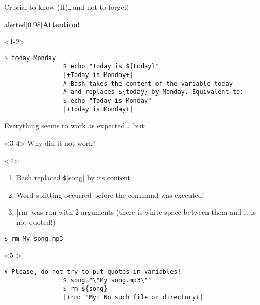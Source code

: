 \begin{frame}[fragile]{Crucial to know (II)}{\ldots{}and not to forget!}
    \begin{overlayarea}{\textwidth}{0.5\textheight}
        \vspace{-9mm}
        \begin{varblock}{alerted}[0.98\textwidth]{\textbf{Attention!}}
        \end{varblock}
        \begin{onlyenv}<1-2>
            \begin{lstlisting}[style=MyBash, belowskip=-4mm]
                $ today=Monday
                $ echo "Today is ${today}"
                |+Today is Monday+|
                # Bash takes the content of the variable today
                # and replaces ${today} by Monday. Equivalent to:
                $ echo "Today is Monday"
                |+Today is Monday+|
            \end{lstlisting}
            \centerline{Everything seems to work as expected\ldots\ but:}
        \end{onlyenv}
        \begin{onlyenv}<3-4>
            Why did it not work?
        \end{onlyenv}
        \begin{onlyenv}<4>
            \begin{enumerate}
                \item Bash replaced \texttt{\$}\bash|{song}| by its content
                \item Word splitting occurred before the command was executed!
                \item \bash|rm| was run with 2 arguments (there is white space between them and it is not quoted!)
            \end{enumerate}
            \begin{lstlisting}[style=MyBash, numbers=none]
                $ rm My song.mp3
            \end{lstlisting}
        \end{onlyenv}
        \begin{onlyenv}<5->
            \begin{lstlisting}[style=MyBash]
                # Please, do not try to put quotes in variables!
                $ song="\"My song.mp3\""
                $ rm ${song}
                |+rm: "My: No such file or directory+|

\end{lstlisting}
\end{onlyenv}
\end{overlayarea}
\end{frame}
